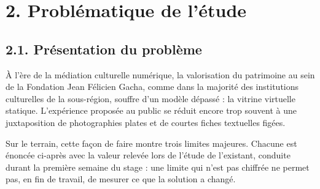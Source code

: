 \section*{2. Problématique de l'étude}

\subsection*{2.1. Présentation du problème}

À l'ère de la médiation culturelle numérique, la valorisation du patrimoine au
sein de la Fondation Jean Félicien Gacha, comme dans la majorité des
institutions culturelles de la sous-région, souffre d'un modèle dépassé : la
vitrine virtuelle statique. L'expérience proposée au public se réduit encore
trop souvent à une juxtaposition de photographies plates et de courtes fiches
textuelles figées.

Sur le terrain, cette façon de faire montre trois limites majeures. Chacune est
énoncée ci-après avec la valeur relevée lors de l'étude de l'existant, conduite
durant la première semaine du stage : une limite qui n'est pas chiffrée ne
permet pas, en fin de travail, de mesurer ce que la solution a changé.

